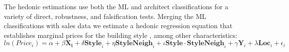\documentclass[]{article}
\begin{document}



The hedonic estimations use both the ML and architect classifications for a variety of direct, robustness, and falsification tests. Merging the ML classifications with sales data
\autocite{LandRegistry2016a} we estimate a hedonic regression equation
that establishes marginal prices for the building style
\autocites[similar
to][]{Moorhouse1994}{Asabere1989}{Vandell1989}{Fuerst2011}{Plaut2006},
among other characteristics: \begin{equation} \label{eq:hed}
  ln(Price_i) = \alpha + \beta\mathbf{X_i} + \delta\mathbf{Style}_i + \eta\mathbf{StyleNeigh}_i + \iota\mathbf{Style\cdot StyleNeigh}_i  +\gamma\mathbf{Y}_i + \lambda\mathbf{Loc}_i +  \epsilon_i
\end{equation}
\end{document}
